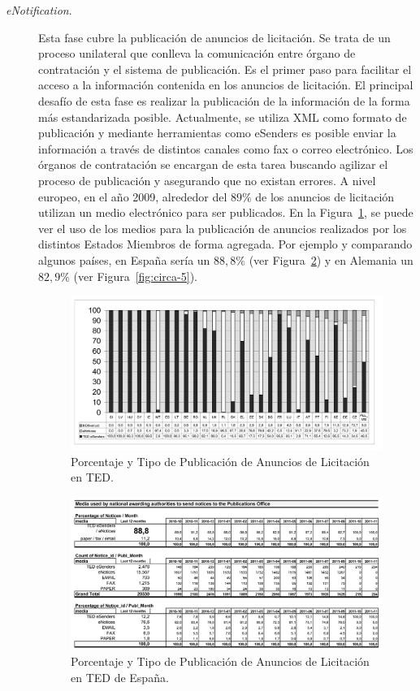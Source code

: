 \begin{description}

 \item [\textit{eNotification}.] Esta fase cubre la publicación de anuncios de licitación. Se trata
de un proceso unilateral que conlleva la comunicación entre órgano de contratación y el sistema
de publicación. Es el primer paso para facilitar el acceso a la información contenida
en los anuncios de licitación. El principal desafío de esta fase es realizar la publicación
de la información de la forma más estandarizada posible. Actualmente, se utiliza XML como 
formato de publicación y mediante herramientas como eSenders es posible enviar la información
a través de distintos canales como fax o correo electrónico. Los órganos de contratación 
se encargan de esta tarea buscando agilizar el proceso de publicación y asegurando
que no existan errores. A nivel europeo, en el año 2009, alrededor del $89\%$ de los anuncios de licitación
utilizan un medio electrónico para ser publicados. En la Figura~\ref{fig:circa-1}, se puede ver el uso 
de los medios para la publicación de anuncios realizados por los distintos Estados Miembros de forma agregada. Por ejemplo y comparando algunos países, 
en España sería un $88,8\%$  (ver Figura~\ref{fig:circa-6}) y en Alemania un $82,9\%$ (ver Figura~\ref{fig:circa-5}).


\begin{figure}[!htb]
\centering
	\includegraphics[width=16cm]{images/phd/eproc/circa-1}
\caption{Porcentaje y Tipo de Publicación de Anuncios de Licitación en TED.}
\label{fig:circa-1}
\end{figure}


\begin{figure}[!htb]
\centering
	\includegraphics[width=16cm]{images/phd/eproc/circa-6}
\caption{Porcentaje y Tipo de Publicación de Anuncios de Licitación en TED de España.}
\label{fig:circa-6}
\end{figure}



\end{description}
